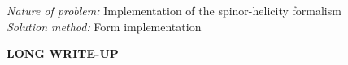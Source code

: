\documentclass[preprint,number,12pt,sort&compress]{elsarticle}
\begin{document}
\begin{small}
{\em Nature of problem:} Implementation of the spinor-helicity formalism\\
% 
{\em Solution method:} Form implementation\\
\end{small}

\newpage

\hspace{1pc}
{\bf LONG WRITE-UP}
\end{document}
